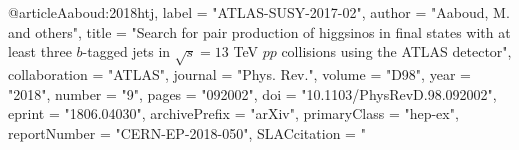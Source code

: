 @article{Aaboud:2018htj,
      label          = "ATLAS-SUSY-2017-02",
      author         = "Aaboud, M. and others",
      title          = "{Search for pair production of higgsinos in final states
                        with at least three $b$-tagged jets in $\sqrt{s} = 13$ TeV
                        $pp$ collisions using the ATLAS detector}",
      collaboration  = "ATLAS",
      journal        = "Phys. Rev.",
      volume         = "D98",
      year           = "2018",
      number         = "9",
      pages          = "092002",
      doi            = "10.1103/PhysRevD.98.092002",
      eprint         = "1806.04030",
      archivePrefix  = "arXiv",
      primaryClass   = "hep-ex",
      reportNumber   = "CERN-EP-2018-050",
      SLACcitation   = "%
}

